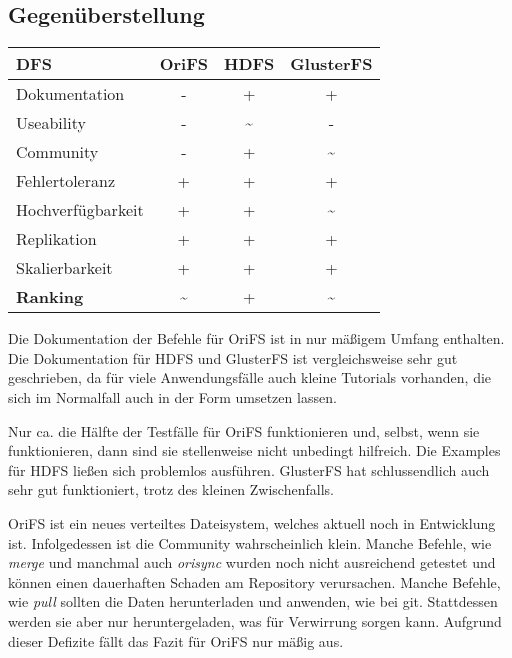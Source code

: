 \subsection{Gegenüberstellung}
\label{subsec:Gegenüberstellung}
\begin{table}[h]
\centering
	\begin{tabular}{|l|c|c|c|}
		\hline
		\textbf{DFS}     & \textbf{OriFS} & \textbf{HDFS} & \textbf{GlusterFS} \\ \hline \hline
		Dokumentation    &      -         &      +        &          +         \\ \hline
		Useability        &      -         &\textsubscript{\huge\textasciitilde}&          -         \\ \hline
		Community        &      -         &      +        &\textsubscript{\huge\textasciitilde}\\ \hline
		Fehlertoleranz  &      +         &      +        &          +         \\ \hline
		Hochverfügbarkeit &      +         &      +        &\textsubscript{\huge\textasciitilde}\\ \hline
		Replikation      &      +         &      +        &          +         \\ \hline
		Skalierbarkeit     &      +         &      +        &          +         \\ \hline \hline
		\textbf{Ranking} & \textsubscript{\huge\textasciitilde}               &+&\textsubscript{\huge\textasciitilde}\\ \hline
	\end{tabular}
\end{table}

Die Dokumentation der Befehle für OriFS ist in nur mäßigem Umfang enthalten. Die Dokumentation für HDFS und GlusterFS ist vergleichsweise sehr gut geschrieben, da für viele Anwendungsfälle auch kleine Tutorials vorhanden, die sich im Normalfall auch in der Form umsetzen lassen.

Nur ca. die Hälfte der Testfälle für OriFS funktionieren und, selbst, wenn sie funktionieren, dann sind sie stellenweise nicht unbedingt hilfreich. Die Examples für HDFS ließen sich problemlos ausführen. GlusterFS hat schlussendlich auch sehr gut funktioniert, trotz des kleinen Zwischenfalls.

OriFS ist ein neues verteiltes Dateisystem, welches aktuell noch in Entwicklung ist. Infolgedessen ist die Community wahrscheinlich klein. Manche Befehle, wie \textit{merge} und manchmal auch \textit{orisync} wurden noch nicht ausreichend getestet und können einen dauerhaften Schaden am Repository verursachen. Manche Befehle, wie \textit{pull} sollten die Daten herunterladen und anwenden, wie bei git. Stattdessen werden sie aber nur heruntergeladen, was für Verwirrung sorgen kann. Aufgrund dieser Defizite fällt das Fazit für OriFS nur mäßig aus.